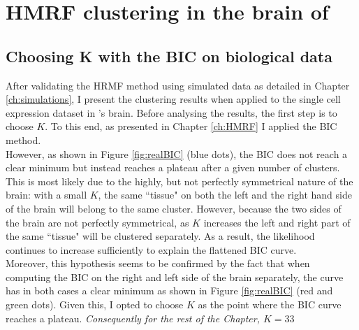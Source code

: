 \chapter{HMRF clustering in the brain of \platyfull{}}\label{ch:biology} 


	\section{Choosing K with the BIC on biological data}
	After validating the HRMF method using simulated data as detailed in Chapter \ref{ch:simulations}, I present the clustering results when applied to the single cell expression dataset in \platy{}'s brain. Before analysing the results, the first step is to choose $K$. To this end, as presented in Chapter \ref{ch:HMRF} I applied the BIC method.\\
	
	However, as shown in Figure \ref{fig:realBIC} (blue dots), the BIC does not reach a clear minimum but instead reaches a plateau after a given number of clusters. This is most likely due to the highly, but not perfectly symmetrical nature of the brain: with a small $K$, the same ``tissue" on both the left and the right hand side of the brain will belong to the same cluster. However, because the two sides of the brain are not perfectly symmetrical, as $K$ increases the left and right part of the same ``tissue" will be clustered separately. As a result, the likelihood continues to increase sufficiently to explain the flattened BIC curve.\\
	
	 Moreover, this hypothesis seems to be confirmed by the fact that when computing the BIC on the right and left side of the brain separately, the curve has in both cases a clear minimum as shown in Figure \ref{fig:realBIC} (red and green dots). Given this, I opted to choose $K$ as the point where the BIC curve reaches a plateau. \emph{Consequently for the rest of the Chapter, $K = 33$}\\
	 
	 
	
